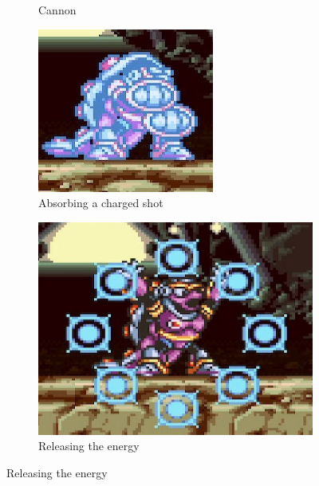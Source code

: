 \begin{figure}[htp]
\begin{subfigure}[t]{0.4\textwidth}
		\caption{Cannon}
	\end{subfigure}	
	\begin{subfigure}{0.35\textwidth}
		\centering
		\includegraphics[width=\linewidth]{figures/X1/Armored_armadillo/Armadillo_energy_1.jpg}
		\caption{Absorbing a charged shot}
	\end{subfigure}
	\begin{subfigure}{0.42\textwidth}
		\centering
		\includegraphics[width=\linewidth]{figures/X1/Armored_armadillo/Armadillo_energy_2.jpg}
		\caption{Releasing the energy}
	\end{subfigure}
\end{figure}
